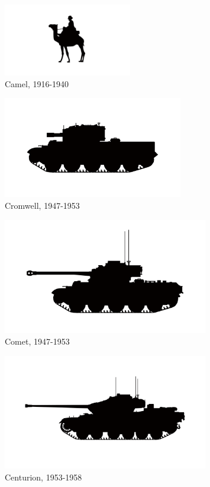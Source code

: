 \begin{figure}[h]
  \centering
  \includegraphics[width=0.5\textwidth]{platforms/camel.pdf}
  \caption*{Camel, 1916-1940}
\end{figure}

\begin{figure}[h]
  \centering
  \includegraphics[width=0.7\textwidth]{platforms/cromwell.pdf}
  \caption*{Cromwell, 1947-1953}
\end{figure}

\begin{figure}[h]
  \centering
  \includegraphics[width=0.8\textwidth]{platforms/comet.pdf}
  \caption*{Comet, 1947-1953}
\end{figure}

\begin{figure}[h]
  \centering
  \includegraphics[width=0.8\textwidth]{platforms/centurion.pdf}
  \caption*{Centurion, 1953-1958}
\end{figure}

